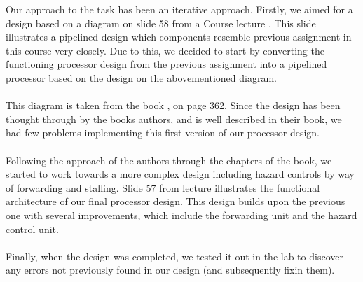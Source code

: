 Our approach to the task has been an iterative approach. Firstly, we aimed for a
design based on a diagram on slide 58 from a Course lecture \cite{slides-6}.
This slide illustrates a pipelined design which components resemble previous
assignment in this course very closely. Due to this, we decided to start by
converting the functioning processor design from the previous assignment into a
pipelined processor based on the design on the abovementioned diagram.
\paragraph*{}
This diagram is taken from the book \cite{patterson12}, on page 362. Since the
design has been thought through by the books authors, and is well described in
their book, we had few problems implementing this first version of our processor
design.
\paragraph*{}
Following the approach of the authors through the chapters of the book, we
started to work towards a more complex design including hazard controls by way
of forwarding and stalling. Slide 57 from lecture \cite{slides-7} illustrates
the functional architecture of our final processor design. This design builds
upon the previous one with several improvements, which include the forwarding
unit and the hazard control unit.
\paragraph*{}
Finally, when the design was completed, we tested it out in the lab to discover
any errors not previously found in our design (and subsequently fixin them).

